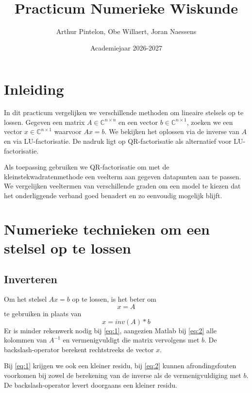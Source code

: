 \documentclass{kulakarticle}
\title{Practicum Numerieke Wiskunde}
\author{Arthur Pintelon, Obe Willaert, Joran Naessens}
\date{Academiejaar 2026-2027}
\begin{document}
	\maketitle
	
	\tableofcontents
	
	\clearpage
	
	\section{Inleiding}
	
	In dit practicum vergelijken we verschillende methoden om lineaire
	stelsels op te lossen. Gegeven een matrix \(A \in \mathbb{C}^{n\times n}\)
	en een vector \(b \in \mathbb{C}^{n\times 1}\), zoeken we een vector
	\(x \in \mathbb{C}^{n\times 1}\) waarvoor \(Ax=b\). We bekijken het oplossen
	via de inverse van \(A\) en via LU-factorisatie. De nadruk ligt op
	QR-factorisatie als alternatief voor LU-factorisatie.
	
	Als toepassing gebruiken we QR-factorisatie om met de
	kleinstekwadratenmethode een veelterm aan gegeven datapunten aan te
	passen. We vergelijken veeltermen van verschillende graden om een
	model te kiezen dat het onderliggende verband goed benadert en
	zo eenvoudig mogelijk blijft.
	
	\section{Numerieke technieken om een stelsel op te lossen}
	\subsection{Inverteren}
	Om het stelsel \(Ax=b\) op te lossen, is het beter om 
	\begin{equation}
		x = A \label{eq:1}
	\end{equation}
	te gebruiken in plaats van 
	\begin{equation}
	x = inv(A)*b\label{eq:2}
	\end{equation}
	Er is minder rekenwerk nodig bij \ref{eq:1}, aangezien Matlab bij \ref{eq:2} alle kolommen van \(A^{-1}\) en vermenigvuldigt die matrix vervolgens met \(b\). De backslash-operator berekent rechtstreeks de vector \(x\).
	
	Bij \ref{eq:1} krijgen we ook een kleiner residu, bij \ref{eq:2} kunnen afrondingsfouten voorkomen bij zowel de berekening van de inverse als de vermenigvuldiging met \(b\). De backslash-operator levert doorgaans een kleiner residu.
	
\end{document}
